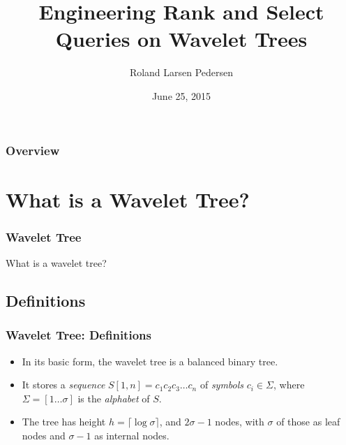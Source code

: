 \documentclass{beamer}
\title[Wavelet Tree]{Engineering Rank and Select Queries on Wavelet Trees} %
\author{Roland Larsen Pedersen} %
\institute[Datalogi] %
{
Datalogi, Aarhus Universitet \\ %
\medskip
\textit{Thesis defence}
}
\date{June 25, 2015} %
\begin{document}
\begin{frame}
\titlepage %
\end{frame}

\begin{frame}
\frametitle{Overview} %
\tableofcontents %
\end{frame}



\section{What is a Wavelet Tree?}

\begin{frame}
\frametitle{Wavelet Tree}
\begin{center} \Huge{What is a wavelet tree?} \end{center}
\end{frame}

\subsection{Definitions}
\begin{frame}
\frametitle{Wavelet Tree: Definitions}
\begin{itemize}
\item In its basic form, the wavelet tree is a balanced binary tree. 
\item It stores a \textit{sequence} $S[1,n] = c_1c_2c_3 \ldots c_n$ of \textit{symbols} $c_i \in \Sigma$, where $\Sigma = [1 \ldots \sigma]$ is the \textit{alphabet} of $S$.
\item The tree has height $h = \lceil \log \sigma \rceil$, and $2 \sigma - 1$ nodes, with $\sigma$ of those as leaf nodes and $\sigma - 1$ as internal nodes.
\end{itemize}

\end{frame}
\end{document}
